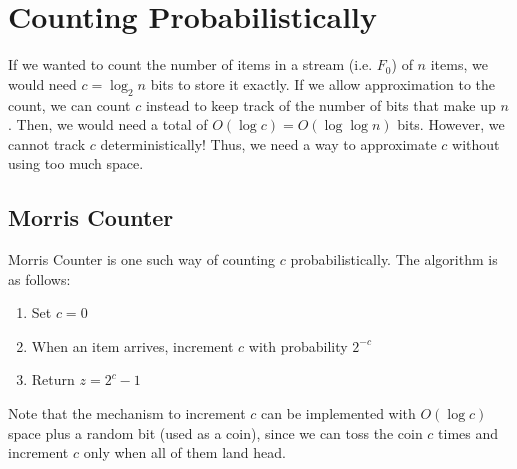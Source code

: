 \documentclass[12pt]{article}
\begin{document}
\maketitle
\section{Counting Probabilistically}
If we wanted to count the number of items in a stream (i.e. $F_0$) of $n$ items, we would need $c=\log_2{n}$ bits to store it exactly. If we allow approximation to the count, we can count $c$ instead to keep track of the number of bits that make up $n$. Then, we would need a total of $O(\log{c})=O(\log\log{n})$ bits.
However, we cannot track $c$ deterministically! Thus, we need a way to approximate $c$ without using too much space.
\subsection{Morris Counter}
Morris Counter is one such way of counting $c$ probabilistically. The algorithm is as follows:
\begin{enumerate}
\item Set $c=0$
\item When an item arrives, increment $c$ with probability $2^{-c}$
\item Return $z=2^c-1$
\end{enumerate}
Note that the mechanism to increment $c$ can be implemented with $O(\log{c})$ space plus a random bit (used as a coin), since we can toss the coin $c$ times and increment $c$ only when all of them land head.
\end{document}

